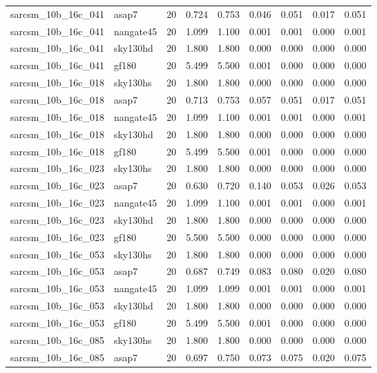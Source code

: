 \begin{tabular}{llrrrrrrr}
sarcsm\_10b\_16c\_041 & asap7 & 20 & 0.724 & 0.753 & 0.046 & 0.051 & 0.017 & 0.051 \\
sarcsm\_10b\_16c\_041 & nangate45 & 20 & 1.099 & 1.100 & 0.001 & 0.001 & 0.000 & 0.001 \\
sarcsm\_10b\_16c\_041 & sky130hd & 20 & 1.800 & 1.800 & 0.000 & 0.000 & 0.000 & 0.000 \\
sarcsm\_10b\_16c\_041 & gf180 & 20 & 5.499 & 5.500 & 0.001 & 0.000 & 0.000 & 0.000 \\
sarcsm\_10b\_16c\_018 & sky130hs & 20 & 1.800 & 1.800 & 0.000 & 0.000 & 0.000 & 0.000 \\
sarcsm\_10b\_16c\_018 & asap7 & 20 & 0.713 & 0.753 & 0.057 & 0.051 & 0.017 & 0.051 \\
sarcsm\_10b\_16c\_018 & nangate45 & 20 & 1.099 & 1.100 & 0.001 & 0.001 & 0.000 & 0.001 \\
sarcsm\_10b\_16c\_018 & sky130hd & 20 & 1.800 & 1.800 & 0.000 & 0.000 & 0.000 & 0.000 \\
sarcsm\_10b\_16c\_018 & gf180 & 20 & 5.499 & 5.500 & 0.001 & 0.000 & 0.000 & 0.000 \\
sarcsm\_10b\_16c\_023 & sky130hs & 20 & 1.800 & 1.800 & 0.000 & 0.000 & 0.000 & 0.000 \\
sarcsm\_10b\_16c\_023 & asap7 & 20 & 0.630 & 0.720 & 0.140 & 0.053 & 0.026 & 0.053 \\
sarcsm\_10b\_16c\_023 & nangate45 & 20 & 1.099 & 1.100 & 0.001 & 0.001 & 0.000 & 0.001 \\
sarcsm\_10b\_16c\_023 & sky130hd & 20 & 1.800 & 1.800 & 0.000 & 0.000 & 0.000 & 0.000 \\
sarcsm\_10b\_16c\_023 & gf180 & 20 & 5.500 & 5.500 & 0.000 & 0.000 & 0.000 & 0.000 \\
sarcsm\_10b\_16c\_053 & sky130hs & 20 & 1.800 & 1.800 & 0.000 & 0.000 & 0.000 & 0.000 \\
sarcsm\_10b\_16c\_053 & asap7 & 20 & 0.687 & 0.749 & 0.083 & 0.080 & 0.020 & 0.080 \\
sarcsm\_10b\_16c\_053 & nangate45 & 20 & 1.099 & 1.099 & 0.001 & 0.001 & 0.000 & 0.001 \\
sarcsm\_10b\_16c\_053 & sky130hd & 20 & 1.800 & 1.800 & 0.000 & 0.000 & 0.000 & 0.000 \\
sarcsm\_10b\_16c\_053 & gf180 & 20 & 5.499 & 5.500 & 0.001 & 0.000 & 0.000 & 0.000 \\
sarcsm\_10b\_16c\_085 & sky130hs & 20 & 1.800 & 1.800 & 0.000 & 0.000 & 0.000 & 0.000 \\
sarcsm\_10b\_16c\_085 & asap7 & 20 & 0.697 & 0.750 & 0.073 & 0.075 & 0.020 & 0.075 \\

\end{tabular}
